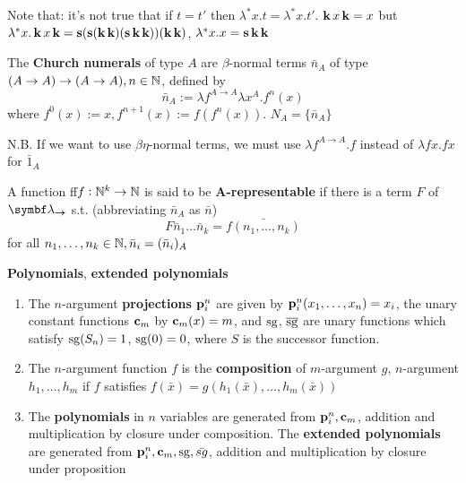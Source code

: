 \documentclass[11pt]{article}
\begin{document}
\begin{remark}
Note that: it's not true that if \(t=t'\) then \(\lambda^*x.t=\lambda^*x.t'\). 
\(\operatorname{\textbf{k}} x\operatorname{\textbf{k}}=x\) but \(\lambda^*x.\operatorname{\textbf{k}} x\operatorname{\textbf{k}}=\operatorname{\textbf{s}}(\operatorname{\textbf{s}}(\operatorname{\textbf{k}}\operatorname{\textbf{k}})(\operatorname{\textbf{s}}\operatorname{\textbf{k}}\operatorname{\textbf{k}}))(\operatorname{\textbf{k}}\operatorname{\textbf{k}})\),
\(\lambda^*x.x=\operatorname{\textbf{s}}\operatorname{\textbf{k}}\operatorname{\textbf{k}}\)
\end{remark}

\begin{definition}[]
The \textbf{Church numerals} of type \(A\) are \(\beta\)-normal terms \(\bar{n}_A\) of type 
\((A\to A)\to(A\to A), n\in\mathbb{N}\), defined by
\begin{equation*}
\bar{n}_A:=\lambda f^{A\to A}\lambda x^A.f^n(x)
\end{equation*}
where \(f^0(x):=x,f^{n+1}(x):=f(f^n(x))\). \(N_A=\{\bar{n}_A\}\)
\end{definition}
N.B. If we want to use \(\beta \eta\)-normal terms, we must use \(\lambda f^{A\to
   A}.f\) instead of \(\lambda fx.fx\) for \(\bar{1}_A\)

\begin{definition}[]
A function ff\(f:\mathbb{N}^k\to\mathbb{N}\) is said to be \textbf{A-representable} if there is a term \(F\)
of \(\blambda_{\bto}\) s.t. (abbreviating \(\bar{n}_A\) as \(\bar{n}\))
\begin{equation*}
F\bar{n}_1\dots\bar{n}_k=\bar{f(n_1,\dots,n_k)}
\end{equation*}
for all \(n_1,\dots,n_k\in\mathbb{N},\bar{n}_i=(\bar{n}_i)_A\)
\end{definition}


\begin{definition}[]
\textbf{Polynomials}, \textbf{extended polynomials}
\begin{enumerate}
\item The \(n\)-argument \textbf{projections} \(\operatorname{\textbf{p}}_i^n\) are given by
\(\operatorname{\textbf{p}}_i^n(x_1,\dots,x_n)=x_i\), the unary constant functions \(\operatorname{\textbf{c}}_m\) by
\(\operatorname{\textbf{c}}_m(x)=m\), and \(\operatorname{sg}\), \(\overline{\operatorname{sg}}\) are unary functions which satisfy
\(\operatorname{sg}(S_n)=1\), \(\operatorname{sg}(0)=0\), where \(S\) is the successor function.
\item The \(n\)-argument function \(f\) is the \textbf{composition} of \(m\)-argument \(g\),
\(n\)-argument \(h_1,\dots,h_m\) if \(f\) satisfies
\(f(\bar{x})=g(h_1(\bar{x}),\dots,h_m(\bar{x}))\)
\item The \textbf{polynomials} in \(n\) variables are generated from \(\operatorname{\textbf{p}}_i^n,\operatorname{\textbf{c}}_m\),
addition and multiplication by closure under composition. The \textbf{extended
polynomials} are generated from \(\operatorname{\textbf{p}}_i^n,\operatorname{\textbf{c}}_m,\operatorname{sg},\bar{sg}\), addition and
multiplication by closure under proposition
\end{enumerate}
\end{definition}
\end{document}
